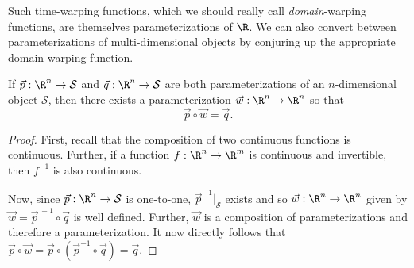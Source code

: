 Such time-warping functions, which we should really call \emph{domain}-warping
functions,
are themselves parameterizations of $\R$.  We can also
convert between parameterizations of multi-dimensional objects by conjuring up the
appropriate domain-warping function.

\begin{theorem}
	If $\vec p:\R^n\to\mathcal S$ and $\vec q:\R^n\to\mathcal S$ are both
	parameterizations of an $n$-dimensional object $\mathcal S$, then there exists a parameterization
	$\vec w:\R^n\to\R^n$ so that 
	\[
		\vec p\circ \vec w = \vec q.
	\]
\end{theorem}
\begin{proof}
	First, recall that the composition of two continuous functions is continuous.  Further,
	if a function $f:\R^n\to\R^m$ is continuous and invertible, then $f^{-1}$ is also continuous.

	Now, since $\vec p:\R^n\to\mathcal S$ is one-to-one, $\vec p^{-1}\Big|_{\mathcal S}$ exists
	and so $\vec w:\R^n\to\R^n$ given by $\vec w=\vec p^{\,-1}\circ\vec q$ is well defined.  Further, $\vec w$
	is a composition of parameterizations and therefore a parameterization.  It now directly follows that
	$\vec p\circ \vec w= \vec p\circ(\vec p^{-1}\circ \vec q) = \vec q$.
\end{proof}

